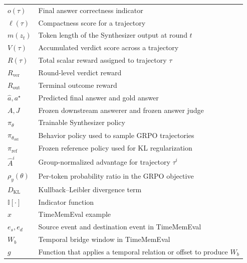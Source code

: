 \begin{longtable}{p{}p{}}
$o(\tau)$ & Final answer correctness indicator\\
$\ell(\tau)$ & Compactness score for a trajectory\\
$m(z_t)$ & Token length of the Synthesizer output at round $t$\\
$V(\tau)$ & Accumulated verdict score across a trajectory\\
$R(\tau)$ & Total scalar reward assigned to trajectory $\tau$\\
$R_{\mathrm{ver}}$ & Round-level verdict reward\\
$R_{\mathrm{out}}$ & Terminal outcome reward\\
$\hat{a},a^\star$ & Predicted final answer and gold answer\\
$A,J$ & Frozen downstream answerer and frozen answer judge\\
$\pi_\theta$ & Trainable Synthesizer policy\\
$\pi_{\theta_{\mathrm{old}}}$ & Behavior policy used to sample GRPO trajectories\\
$\pi_{\mathrm{ref}}$ & Frozen reference policy used for KL regularization\\
$\hat{A}^i$ & Group-normalized advantage for trajectory $\tau^i$\\
$\rho_y(\theta)$ & Per-token probability ratio in the GRPO objective\\
$D_{\mathrm{KL}}$ & Kullback--Leibler divergence term\\
$\mathbb{I}[\cdot]$ & Indicator function\\
$x$ & TimeMemEval example\\
$e_s,e_d$ & Source event and destination event in TimeMemEval\\
$W_b$ & Temporal bridge window in TimeMemEval\\
$g$ & Function that applies a temporal relation or offset to produce $W_b$\\

\end{longtable}

\renewcommand*{\arraystretch}{1}

